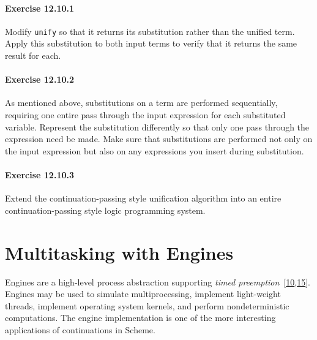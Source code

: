 \paragraph{Exercise \label{examples_g205}12.10.1}


\label{examples_s79}Modify \texttt{unify} so that it returns its substitution rather
than the unified term.
Apply this substitution to both input terms to verify that it
returns the same result for each.


\paragraph{Exercise \label{examples_g206}12.10.2}


\label{examples_s80}As mentioned above, substitutions on a term are performed
sequentially, requiring one entire pass through the input expression
for each substituted variable.
Represent the substitution differently so that only one pass
through the expression need be made.
Make sure that substitutions are performed not only on the input
expression but also on any expressions you insert during substitution.


\paragraph{Exercise \label{examples_g207}12.10.3}


\label{examples_s81}Extend the continuation-passing style unification algorithm into
an entire continuation-passing style logic programming system.



\section{\label{examples_g208}\label{examples_h11}Multitasking with Engines\label{examples_SECTEXENGINES}}



\label{examples_s82}Engines are a high-level process abstraction supporting
\label{examples_s83}\textit{timed
preemption} [\hyperref[bibliography_g228]{10},\hyperref[bibliography_g233]{15}].
Engines may be used to simulate \label{examples_s84}multiprocessing,
implement \label{examples_s85}\label{examples_s86}light-weight threads,
implement operating
system kernels, and perform \label{examples_s87}nondeterministic computations.
The engine implementation is one of the more interesting applications
of \label{examples_s88}continuations in Scheme.


